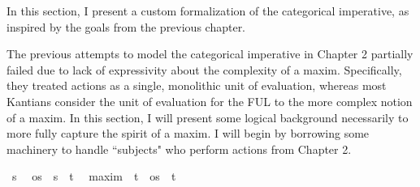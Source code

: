 %
\begin{isabellebody}%
%
%
\isadelimtheory
%
\endisadelimtheory
%
\isatagtheory
%
\endisatagtheory
{\isafoldtheory}%
%
\isadelimtheory
%
\endisadelimtheory
%
\isadelimdocument
%
\endisadelimdocument
%
\isatagdocument
%
\isamarkuptrue%
%
\endisatagdocument
{\isafolddocument}%
%
\isadelimdocument
%
\endisadelimdocument
%
\begin{isamarkuptext}%
In this section, I present a custom formalization of the categorical imperative, as inspired by 
the goals from the previous chapter.%
\end{isamarkuptext}\isamarkuptrue%
%
\isadelimdocument
%
\endisadelimdocument
%
\isatagdocument
%
\isamarkuptrue%
%
\endisatagdocument
{\isafolddocument}%
%
\isadelimdocument
%
\endisadelimdocument
%
\begin{isamarkuptext}%
The previous attempts to model the categorical imperative in Chapter 2 partially failed due to 
lack of expressivity about the complexity of a maxim. Specifically, they treated actions as a single, 
monolithic unit of evaluation, whereas most Kantians consider the unit of evaluation for the FUL to the more
complex notion of a maxim. In this section, I will present some logical background necessarily to more fully 
capture the spirit of a maxim. I will begin by borrowing some machinery to handle ``subjects" who perform 
actions from Chapter 2.%
\end{isamarkuptext}\isamarkuptrue%
\isamarkupfalse%
\ s\ %
\isanewline
\isanewline
{}\isamarkupfalse%
\ os\ {\isacharequal}\ {\isachardoublequoteopen}{\isacharparenleft}s\ {\isasymRightarrow}\ t{\isacharparenright}{\isachardoublequoteclose}\ %
\isanewline
\isanewline
{}\isamarkupfalse%
\ maxim\ {\isacharequal}\ {\isachardoublequoteopen}{\isacharparenleft}t\ {\isacharasterisk}\ os\ {\isacharasterisk}\ t{\isacharparenright}{\isachardoublequoteclose}\ %
\end{isabellebody}
